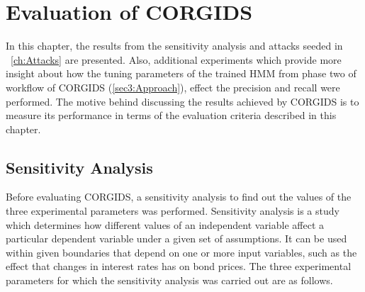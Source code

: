 
\chapter{\textbf{Evaluation of \ac{CORGIDS}}}
\label{sec6:Evaluation}
In this chapter, the results from the sensitivity analysis and attacks seeded in ~\autoref{ch:Attacks} are presented. Also, additional experiments which provide more insight about how the tuning parameters of the trained HMM from phase two of workflow of \ac{CORGIDS} (\autoref{sec3:Approach}), effect the precision and recall were performed. The motive behind discussing the results achieved by \ac{CORGIDS} is to measure its performance in terms of the evaluation criteria described in this chapter.

\section{Sensitivity Analysis}
\label{sensitivityAnalysis}

Before evaluating \ac{CORGIDS}, a sensitivity analysis to find out the values of the three experimental parameters was performed. Sensitivity analysis is a study which determines how different values of an independent variable affect a particular dependent variable under a given set of assumptions. It can be used within given boundaries that depend on one or more input variables, such as the effect that changes in interest rates has on bond prices. The three experimental parameters for which the sensitivity analysis was carried out are as follows.

